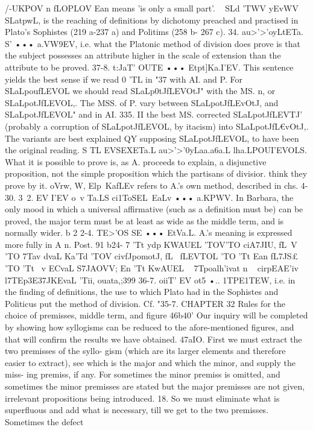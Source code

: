 {{{{{{{{{{{{{{{{{{{{{{{{/-UKPOV n fLOPLOV Ean means 'is only a small part'. ~ SLd 'TWV yEvWV
SLatpwL, is the reaching of definitions by dichotomy preached and
practised in Plato's Sophistes (219 a-237 a) and Politims (258 b-
267 c).
34. au>'>'oyLtETa.~ S' ••• a.VW9EV, i.e. what the Platonic method
of division does prove is that the subject possesses an attribute
higher in the scale of extension than the attribute to be proved.
37-8. t:JaT' OUTE ••• Etpt]Ka.I'EV. This sentence yields the best
sense if we read 0 'TL in "37 with AI. and P. For SLaLpoufLEVOL we
should read SLaLp0tJfLEVOtJ" with the MS. n, or SLaLpotJfLEVOL,. The
MSS. of P. vary between SLaLpotJfLEvOtJ, and SLaLpotJfLEVOL" and in AI.
335. II the best MS. corrected SLaLpotJfLEVTJ' (probably a corruption
of SLaLpotJfLEVOL, by itacism) into SLaLpotJfL€vOtJ,. The variants are best
explained QY supposing SLaLpotJfLEVOL, to have been the original
reading.
S TL EVSEXETa.L au>'>'0yLaa.a6a.L lha.LPOUI'EVOLS. What it is possible
to prove is, as A. proceeds to explain, a disjunctive proposition,
not the simple proposition which the partisans of divisior.
think they prove by it. oVrw, W, Elp~KafLEv refers to A.'s own
method, described in chs. 4-30.
3~2. EV I'EV o~v Ta.LS ci1ToSEL~EaLv ••• a.KPWV. In Barbara,
the only mood in which a universal affirmative (such as a
definition must be) can be proved, the major term must be at
least as wide as the middle term, and is normally wider.
b 2 2-4. TE>'OS SE ••• EtVa.L. A.'s meaning is expressed more
fully in A n. Post. 91 b24- 7 'Tt ydp KWAUEL 'TOV'TO ciA7JIU, fL~V 'TO 7Tav
dvaL Ka'Td 'TOV civfJpomotJ, fL~ fLEVTOL 'TO 'Tt Ean fL7JS£ 'TO 'Tt ~v ECvaL
S7JAOVV; En 'Tt KwAUEL ~ 7Tpoalh'ivat n ~ cirpEAE'iv ~ {l7TEp{3E{37JKEvaL
'Tii, ouata,;399
36-7. oiiT' EV ot5 •.. 1TPE1TEW, i.e. in the finding of definitions,
the use to which Plato had in the Sophistes and Politicus put the
method of division. Cf. "35-7.
CHAPTER 32
Rules for the choice of premisses, middle term, and figure
46b40' Our inquiry will be completed by showing how syllogisms
can be reduced to the afore-mentioned figures, and that will
confirm the results we have obtained.
47aIO. First we must extract the two premisses of the syllo-
gism (which are its larger elements and therefore easier to extract),
see which is the major and which the minor, and supply the miss-
ing premiss, if any. For sometimes the minor premiss is omitted,
and sometimes the minor premisses are stated but the major
premisses are not given, irrelevant propositions being introduced.
18. So we must eliminate what is superfluous and add what is
necessary, till we get to the two premisses. Sometimes the defect
}}}}}}}}}}}}}}}}}}}}}}}}}}}
